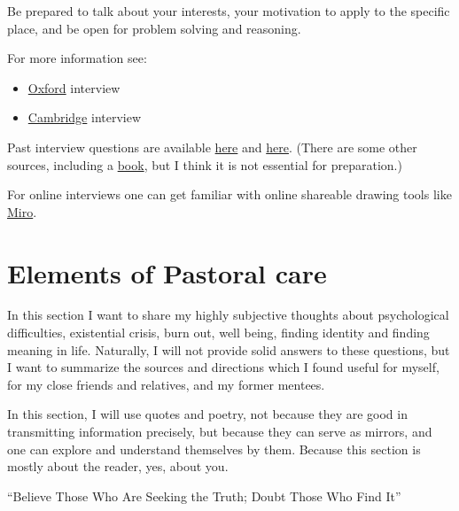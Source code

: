 \documentclass{article}
\begin{document}
Be prepared to talk about your interests, your motivation to apply to the specific place, and be open for problem solving and reasoning.

For more information see:

\begin{itemize}
    \item \href{https://www.ox.ac.uk/admissions/undergraduate/applying-to-oxford/guide/interviews}{Oxford} interview
    \item \href{https://www.undergraduate.study.cam.ac.uk/applying/interviews}{Cambridge} interview
\end{itemize}

Past interview questions are available \href{https://ianramsey.org.uk/wp-content/uploads/2020/08/Sample-Oxbridge-Interview-Questions.pdf}{here} and \href{https://www.thatoxfordgirl.com/post/50-real-life-oxford-university-interview-questions}{here}. (There are some other sources, including a  \href{https://www.amazon.com/Ultimate-Oxbridge-Interview-Guide-UniAdmissions/dp/0993231136}{book}, but I think it is not essential for preparation.)

For online interviews one can get familiar with online shareable drawing tools like \href{https://miro.com/app/dashboard/}{Miro}.

\section{Elements of Pastoral care}

In this section I want to share my highly subjective thoughts about psychological difficulties, existential crisis, burn out, well being, finding identity and finding meaning in life.
Naturally, I will not provide solid answers to these questions, but I want to summarize the sources and directions which I found useful for myself, for my close friends and relatives, and my former mentees.

In this section, I will use quotes and poetry, not because they are good in transmitting information precisely, but because they can serve as mirrors, and one can explore and understand themselves by them. Because this section is mostly about the reader, yes, about you.

\vspace{1cm}
{``Believe Those Who Are Seeking the Truth; Doubt Those Who Find It''
\\[5pt]
}
\end{document}
